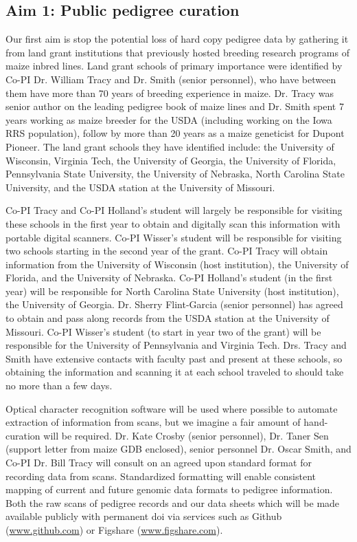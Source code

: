 \documentclass[12pt]{article}
\begin{document}
\subsection*{Aim 1: Public pedigree curation}
Our first aim is stop the potential loss of hard copy pedigree data by gathering it from land grant institutions that previously hosted breeding research programs of maize inbred lines. 
Land grant schools of primary importance were identified by Co-PI Dr. William Tracy and  Dr. Smith (senior personnel), who have between them have more than 70 years of breeding experience in maize. 
Dr. Tracy was senior author on the leading pedigree book of maize lines \cite{gerdes1993compilation} and Dr. Smith spent 7 years working as maize breeder for the USDA (including working on the Iowa RRS population), follow by more than 20 years as a maize geneticist for Dupont Pioneer. The land grant schools they have identified include: the University of Wisconsin, Virginia Tech, the University of Georgia, the University of Florida, Pennsylvania State University, the University of Nebraska, North Carolina State University, and the USDA station at the University of Missouri. 

Co-PI Tracy and Co-PI Holland's student will largely be responsible for visiting these schools in the first year to obtain and digitally scan this information with portable digital scanners. 
Co-PI Wisser's student will be responsible for visiting two schools starting in the second year of the grant.
Co-PI  Tracy will obtain information from the University of Wisconsin (host institution), the University of Florida, and the University of Nebraska. 
Co-PI Holland's student (in the first year) will be responsible for North Carolina State University (host institution), the University of Georgia.
Dr. Sherry Flint-Garcia (senior personnel) has agreed to obtain and pass along records from the USDA station at the University of Missouri. 
Co-PI Wisser's student (to start in year two of the grant) will be responsible for the University of Pennsylvania and Virginia Tech.
Drs. Tracy and Smith have extensive contacts with faculty past and present at these schools, so obtaining the information and scanning it at each school traveled to should take no more than a few days. 

Optical character recognition software will be used where possible to automate extraction of information from scans, but we imagine a fair amount of hand-curation will be required.
Dr. Kate Crosby (senior personnel), Dr. Taner Sen (support letter from maize GDB enclosed), senior personnel Dr. Oscar Smith, and Co-PI Dr. Bill Tracy will consult on an agreed upon standard format for recording data from scans.
Standardized formatting will enable consistent mapping of current and future genomic data formats to pedigree information. Both the raw scans of pedigree records and our data sheets which will be made available publicly with permanent doi via services such as Github (\url{www.github.com}) or Figshare (\url{www.figshare.com}).
\end{document}
